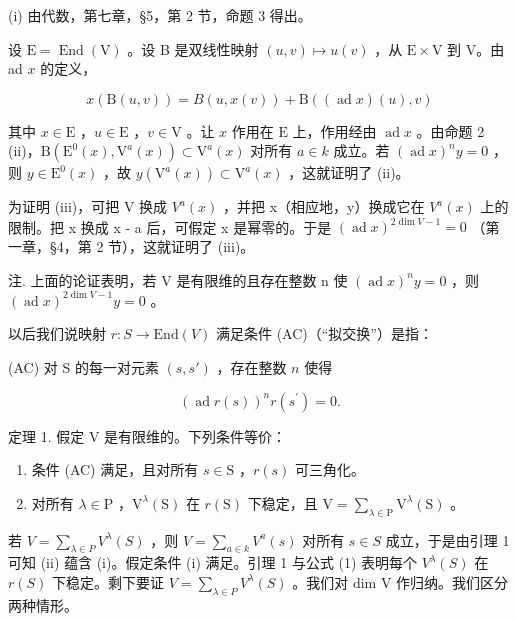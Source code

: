 (i) 由代数，第七章，§5，第 2 节，命题 3 得出。

设 \(\mathrm{E} = \operatorname{End}(\mathrm{V})\) 。设 B 是双线性映射 \((u, v) \mapsto u(v)\) ，从 \(\mathrm{E} \times \mathrm{V}\) 到 V。由 ad \(x\) 的定义，

\[
x (\mathrm{B} (u, v)) = B (u, x (v)) + \mathrm{B} ((\operatorname{ad} x) (u), v)
\]

其中 \(x \in \mathrm{E}\) ，\(u \in \mathrm{E}\) ，\(v \in \mathrm{V}\) 。让 \(x\) 作用在 \(\mathrm{E}\) 上，作用经由 \(\operatorname{ad} x\) 。由命题 2 (ii)，\(\mathrm{B}(\mathrm{E}^0(x), \mathrm{V}^a(x)) \subset \mathrm{V}^a(x)\) 对所有 \(a \in k\) 成立。若 \((\operatorname{ad} x)^n y = 0\) ，则 \(y \in \mathrm{E}^0(x)\) ，故 \(y(\mathrm{V}^a(x)) \subset \mathrm{V}^a(x)\) ，这就证明了 (ii)。

为证明 (iii)，可把 V 换成 \(V^{a}(x)\) ，并把 x（相应地，y）换成它在 \(V^{a}(x)\) 上的限制。把 x 换成 x - a 后，可假定 x 是幂零的。于是 \((\operatorname{ad} x)^{2\dim V-1} = 0\) （第一章，§4，第 2 节），这就证明了 (iii)。

注. 上面的论证表明，若 V 是有限维的且存在整数 n 使 \((\operatorname{ad} x)^{n}y = 0\) ，则 \((\operatorname{ad} x)^{2\dim V-1}y = 0\) 。

以后我们说映射 \(r : S \to \text{End}(V)\) 满足条件 (AC)（“拟交换”）是指：

(AC) 对 S 的每一对元素 \((s, s')\) ，存在整数 \(n\) 使得

\[
(\operatorname{ad} r (s)) ^ {n} r \left(s ^ {\prime}\right) = 0.
\]

定理 1. 假定 V 是有限维的。下列条件等价：

\begin{enumerate}
\def\labelenumi{(\roman{enumi})}
\item
  条件 (AC) 满足，且对所有 \(s \in \mathrm{S}\) ，\(r(s)\) 可三角化。
\item
  对所有 \(\lambda \in \mathrm{P}\) ，\(\mathrm{V}^{\lambda}(\mathrm{S})\) 在 \(r(\mathrm{S})\) 下稳定，且 \(\mathrm{V} = \sum_{\lambda \in \mathrm{P}} \mathrm{V}^{\lambda}(\mathrm{S})\) 。
\end{enumerate}

若 \(V = \sum_{\lambda \in P} V^{\lambda}(S)\) ，则 \(V = \sum_{a \in k} V^{a}(s)\) 对所有 \(s \in S\) 成立，于是由引理 1 可知 (ii) 蕴含 (i)。假定条件 (i) 满足。引理 1 与公式 (1) 表明每个 \(V^{\lambda}(S)\) 在 \(r(S)\) 下稳定。剩下要证 \(V = \sum_{\lambda \in P} V^{\lambda}(S)\) 。我们对 dim V 作归纳。我们区分两种情形。


